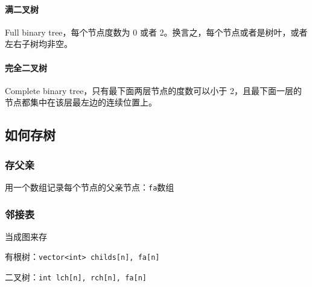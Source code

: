 \paragraph{满二叉树}

Full binary tree，每个节点度数为 0 或者 2。换言之，每个节点或者是树叶，或者左右子树均非空。

\paragraph{完全二叉树}

Complete binary tree，只有最下面两层节点的度数可以小于 2，且最下面一层的节点都集中在该层最左边的连续位置上。

\subsection{如何存树}

\subsubsection{存父亲}

用一个数组记录每个节点的父亲节点：\texttt{fa}数组

\subsubsection{邻接表}

当成图来存

有根树：\texttt{vector<int> childs[n], fa[n]}

二叉树：\texttt{int lch[n], rch[n], fa[n]}
